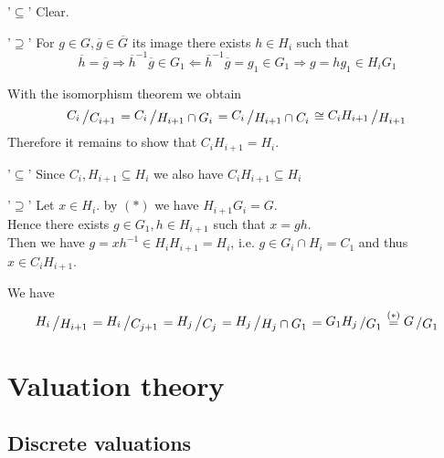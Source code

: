 \documentclass[12pt]{book}
\newcommand{\slant}[2]{{\raisebox{.1em}{$#1$}\left/\raisebox{-.1em}{$#2$}\right.}}
\begin{document}
\begin{spacing}{1.3}
\begin{compactenum}
\begin{compactenum}
\begin{compactenum}
\begin{compactitem}
\item['$\subseteq$'] Clear.
\item['$\supseteq$'] For $g \in G, \overline{g} \in \overline{G}$ its image there exists $h \in H_i$ such that
$$ \overline{h}=\overline{g} \Longrightarrow \overline{h}^{-1}\overline{g} \in G_1 \Longleftarrow \overline{h}^{-1}\overline{g}=g_1 \in G_1 \Longrightarrow g=hg_1 \in H_i G_1$$
\end{compactitem}
With the isomorphism theorem we obtain 
$$\slant{C_i}{C_{i+1}} = \slant{C_i}{H_{i+1} \cap G_i} = \slant{C_i}{H_{i+1}\cap C_i} \cong \slant{C_i H_{i+1}}{H_{i+1}}$$
Therefore it remains to show that $C_i H_{i+1}=H_i$.
\begin{compactitem}
\item['$\subseteq$'] Since $C_i, H_{i+1} \subseteq H_i$ we also have $C_i H_{i+1} \subseteq H_i$
\item['$\supseteq$'] Let $x \in H_i$. by $(*)$ we have $H_{i+1}G_i=G$.\\
Hence there exists $g \in G_1, h \in H_{i+1}$ such that $x=gh$.\\
Then we have $g=x h^{-1} \in H_i H_{i+1}=H_i$, i.e. $g \in G_i \cap H_{i}=C_1$ and thus $x \in C_i H_{i+1}$.
\end{compactitem}
\end{compactenum}
\item We have 
$$\slant{H_i}{H_{i+1}}= \slant{H_i}{C_{j+1}}=\slant{H_j}{C_j}=\slant{H_j}{H_j \cap G_1} = \slant{G_1 H_j}{G_1}\overset{(*)}{=} \slant{G}{G_1}$$
\end{compactenum}
\end{compactenum}



\chapter{Valuation theory}
\thispagestyle{empty}

\setcounter{section}{6}


\renewcommand*\thesection{\S\ \arabic{section}\quad}
\section{Discrete valuations}
\renewcommand*\thesection{\arabic{section}}


\end{spacing}
\end{document}
